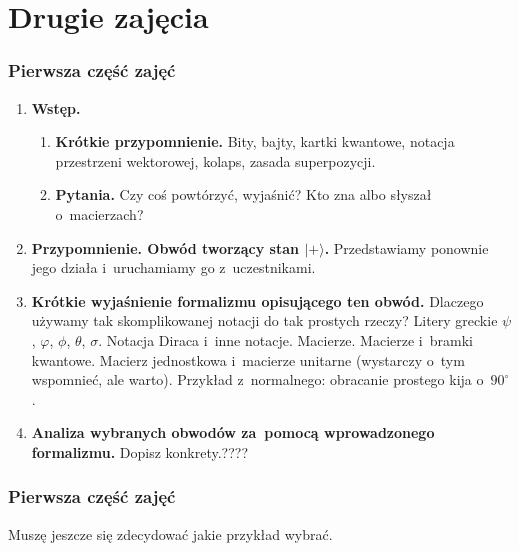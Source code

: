\documentclass[10pt,t]{beamer}
\begin{document}
\section{Drugie zajęcia}



\begin{frame}
  \frametitle{Pierwsza część zajęć}


  \begin{enumerate}
    \RaggedRight

  \item \textbf{Wstęp.}

    \begin{enumerate}
      \RaggedRight

    \item \textbf{Krótkie przypomnienie.} Bity, bajty, kartki kwantowe,
      notacja przestrzeni wektorowej, kolaps, zasada superpozycji.

    \item \textbf{Pytania.} Czy coś powtórzyć, wyjaśnić? Kto zna albo
      słyszał o~macierzach?

    \end{enumerate}

  \item \textbf{Przypomnienie. Obwód tworzący stan $| + \rangle$.}
    Przedstawiamy ponownie jego działa i~uruchamiamy go z~uczestnikami.

  \item \textbf{Krótkie wyjaśnienie formalizmu opisującego ten obwód.}
    Dlaczego używamy tak skomplikowanej notacji do tak prostych rzeczy?
    Litery greckie $\psi$, $\varphi$, $\phi$, $\theta$, $\sigma$.
    Notacja Diraca i~inne notacje. Macierze. Macierze i~bramki kwantowe.
    Macierz jednostkowa i~macierze unitarne (wystarczy o~tym wspomnieć,
    ale warto). Przykład z~normalnego: obracanie prostego kija
    o~$90^{ \circ }$.

  \item \textbf{Analiza wybranych obwodów za~pomocą wprowadzonego
      formalizmu.} Dopisz konkrety.????

  \end{enumerate}

\end{frame}





\begin{frame}
  \frametitle{Pierwsza część zajęć}


  Muszę jeszcze się zdecydować jakie przykład wybrać.

\end{frame}











\end{document}
